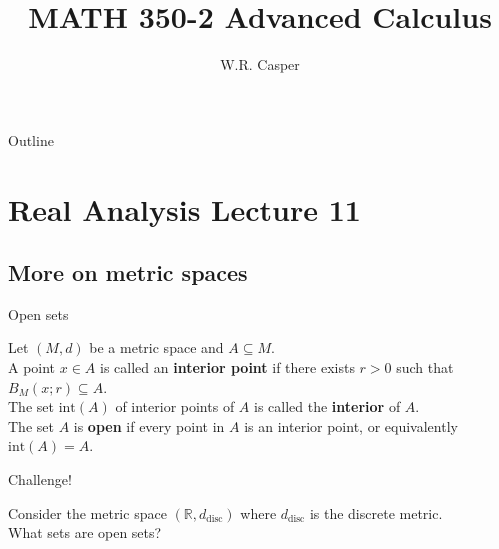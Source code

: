 \documentclass{beamer}
\title{MATH 350-2 Advanced Calculus}
\subtitle
{} %
\author[W.R. Casper] %
{W.R. Casper}
\institute[California State University Fullerton] %
{
  Department of Mathematics\\
  California State University Fullerton}
\begin{document}
\begin{frame}
  \titlepage
\end{frame}

\begin{frame}{Outline}
  \tableofcontents
\end{frame}



\section{Real Analysis Lecture 11}

\subsection{More on metric spaces}

\begin{frame}{Open sets}
\begin{defn}
\pause
Let $(M,d)$ be a metric space and $A\subseteq M$.\\
\pause
A point $x\in A$ is called an \textbf{interior point} if there exists $r>0$ such that $B_M(x;r)\subseteq A$.\\
\pause
The set $\text{int}(A)$ of interior points of $A$ is called the \textbf{interior} of $A$.\\
\pause
The set $A$ is \textbf{open} if every point in $A$ is an interior point, or equivalently $\text{int}(A) = A$.
\end{defn}
\end{frame}

\begin{frame}{Challenge!}
\begin{prob}
Consider the metric space $(\mathbb{R},d_{\text{disc}})$ where $d_{\text{disc}}$ is the discrete metric.\\
What sets are open sets?
\end{prob}
\end{frame}
\end{document}
